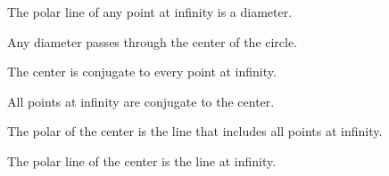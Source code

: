 \begin{property} 
    The polar line of any point at infinity is a diameter. 
\end{property} 
\begin{property} 
    Any diameter passes through the center of the circle. 
\end{property} 
\begin{property} The center is conjugate to every point at infinity.
\end{property} 
\begin{property}
    All points at infinity are conjugate to the center. 
\end{property} 
\begin{property} The polar of the center is the line that includes all points at infinity. 
\end{property} 
\begin{property}
    The polar line of the center is the line at infinity. 
\end{property}

